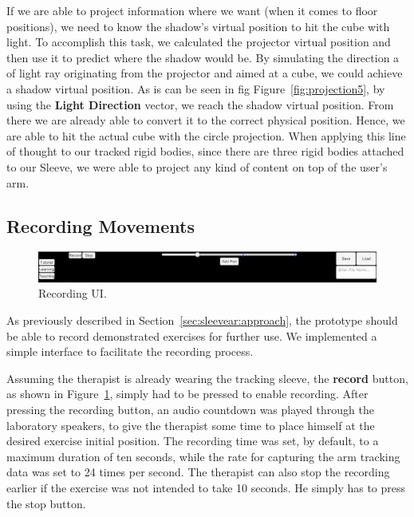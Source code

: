 If we are able to project information where we want (when it comes to floor positions), we need to know the shadow's virtual position to hit the cube with light. 
To accomplish this task, we calculated the projector virtual position and then use it to predict where the shadow would be. 
By simulating the direction a of light ray originating from the projector and aimed at a cube, we could achieve a shadow virtual position. 
As is can be seen in fig Figure~\ref{fig:projection5}, by using the \textbf{Light Direction} vector, we reach the shadow virtual position. 
From there we are already able to convert it to the correct physical position. Hence, we are able to hit the actual cube with the circle projection.
When applying this line of thought to our tracked rigid bodies, since there are three rigid bodies attached to our Sleeve, 
we were able to project any kind of content on top of the user's arm.

\subsection{Recording Movements}

\begin{figure}[!b]
    \begin{center}
        \includegraphics[width=\textwidth]{imgs/impl/recordinginterface}
    \end{center}
    \caption{Recording UI.}
    \label{fig:recordinginterface}
\end{figure}

As previously described in Section~\ref{sec:sleevear:approach}, the prototype should be able to record demonstrated exercises for further use.
We implemented a simple interface to facilitate the recording process.

Assuming the therapist is already wearing the tracking sleeve, the \textbf{record} button, as shown in Figure~\ref{fig:recordinginterface}, simply had to be pressed to enable recording. 
After pressing the recording button, an audio countdown was played through the laboratory speakers, to give the therapist some time to place himself at the desired exercise initial position. 
The recording time was set, by default, to a maximum duration of ten seconds, while the rate for capturing the arm tracking data was set to 24 times per second.
The therapist can also stop the recording earlier if the exercise was not intended to take 10 seconds. He simply has to press the stop button.

